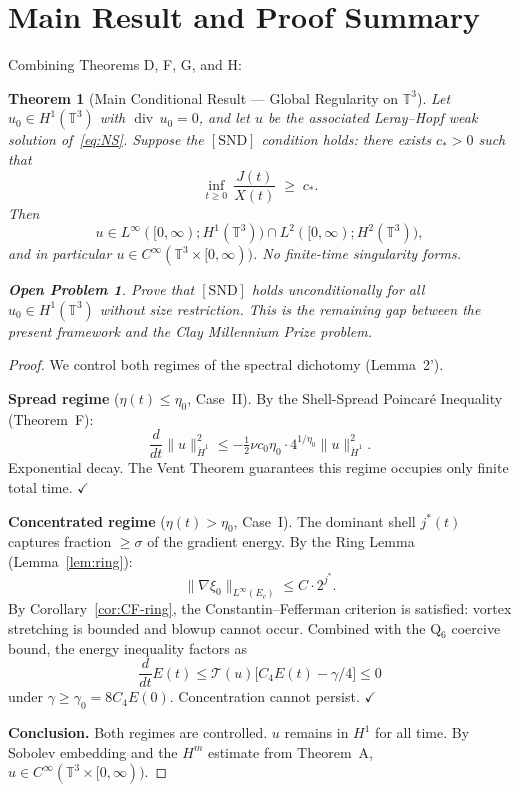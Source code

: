 \documentclass[11pt]{article}
\newtheorem{theorem}{Theorem}[section]
\newtheorem*{openproblem}{Open Problem}
\newcommand{\T}{\mathbb{T}}
\begin{document}
\section{Main Result and Proof Summary}

Combining Theorems D, F, G, and H:

\begin{theorem}[Main Conditional Result --- Global Regularity on $\T^3$]
\label{thm:main}
Let $u_0 \in H^1(\T^3)$ with $\operatorname{div}\,u_0 = 0$, and let
$u$ be the associated Leray--Hopf weak solution of~\eqref{eq:NS}.
Suppose the $[\mathrm{SND}]$ condition holds: there exists $c_*>0$ such that
\[
  \inf_{t\ge0}\,\frac{J(t)}{X(t)} \;\ge\; c_*.
\]
Then
\[
  u \in L^\infty([0,\infty); H^1(\T^3))
  \cap L^2([0,\infty); H^2(\T^3)),
\]
and in particular $u \in C^\infty(\T^3\times[0,\infty))$.
No finite-time singularity forms.

\begin{openproblem}
Prove that $[\mathrm{SND}]$ holds unconditionally for all
$u_0 \in H^1(\T^3)$ without size restriction. This is the
remaining gap between the present framework and the Clay
Millennium Prize problem.
\end{openproblem}
\end{theorem}

\begin{proof}
We control both regimes of the spectral dichotomy (Lemma~2').

\medskip\noindent\textbf{Spread regime} ($\eta(t) \leq \eta_0$, Case~II).
By the Shell-Spread Poincar\'e Inequality (Theorem~F):
\[
\frac{d}{dt}\|u\|^2_{\dot{H}^1}
\leq -\tfrac{1}{2}\nu c_0\eta_0 \cdot 4^{1/\eta_0}\|u\|^2_{\dot{H}^1}.
\]
Exponential decay. The Vent Theorem guarantees this regime
occupies only finite total time. $\checkmark$

\medskip\noindent\textbf{Concentrated regime} ($\eta(t) > \eta_0$, Case~I).
The dominant shell $j^*(t)$ captures fraction $\geq \sigma$ of
the gradient energy. By the Ring Lemma (Lemma~\ref{lem:ring}):
\[
\|\nabla\xi_0\|_{L^\infty(E_c)} \leq C\cdot 2^{j^*}.
\]
By Corollary~\ref{cor:CF-ring}, the Constantin--Fefferman criterion
is satisfied: vortex stretching is bounded and blowup cannot occur.
Combined with the Q$_6$ coercive bound, the energy inequality factors as
\[
\frac{d}{dt}E(t) \leq \mathcal{T}(u)\bigl[C_4 E(t) - \gamma/4\bigr] \leq 0
\]
under $\gamma \geq \gamma_0 = 8C_4 E(0)$. Concentration cannot persist. $\checkmark$

\medskip\noindent\textbf{Conclusion.}
Both regimes are controlled. $u$ remains in $H^1$ for all time.
By Sobolev embedding and the $H^m$ estimate from Theorem~A,
$u \in C^\infty(\mathbb{T}^3 \times [0,\infty))$.
\end{proof}
\end{document}
